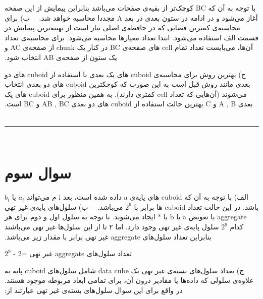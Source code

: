 ‫با توجه به آن که BC کوچک‌تر از بقیه‌ی صفحات می‌باشد بنابراین پیمایش از این صفحه آغاز می‌شود و در ادامه در ستون بعدی در بعد A مجددا محاسبه خواهد شد.
‫
‫‫\vspace{1cm}
‫
‫ب) برای محاسبه‌ی کمترین فضایی که در حافظه‌ی اصلی نیاز است از بهینه‌ترین پیمایش در قسمت الف استفاده می‌شود. ابتدا تعداد معیارها محاسبه می‌شود. برای محاسبه‌ی تعداد آن‌ها، می‌بایست تعداد تمام cell های صفحه‌ی BC در کنار یک chunk از صفحه‌ی AC و یک ستون از صفحه‌ی AB انتخاب شود.
‫


‫\vspace{1cm}
‫
‫ج) بهترین روش برای محاسبه‌ی cuboid های یک بعدی با استفاده از cuboid های دو بعدی مانند روش قبل است به این صورت که کوچکترین cuboid های دو بعدی انتخاب می‌شوند (آن‌هایی که تعداد cell کمتری دارند). به همین منظور برای cuboid های یک بعدی A , B و C بهترین حالت استفاده از cuboid های دو بعدی AB , BC و BC است.
‫
‫
‫\vspace{1cm}
‫
‫\hrule height .4 pt depth 0 pt width 16 cm \relax
‫
‫%
‫
‫\section{سوال سوم}
‫
‫   الف) با توجه به آن که cuboid های پایه‌ی a داده شده است، بعد i م می‌تواند $a_{i}$ یا $b_i$ باشد. در این حالت تعداد cuboid ها برابر با \colorbox{Emerald}{\(2^9\)} می‌باشد.
‫
‫\vspace{1cm}
‫
‫ب) سلول‌های پایه‌ی غیر تهی aggregate با تعویض a یا b با * ایجاد می‌شوند. با توجه به سلول اول و دوم برای هر کدام \(2^9\) سلول پایه‌ی غیر تهی وجود دارد. اما ۲ تا از این سلول‌ها غیر تهی می‌باشند بنابراین تعداد سلول‌های aggregate غیر تهی برابر با مقدار زیر می‌باشد.
‫\begin{center}
‫\colorbox{Emerald}{تعداد سلول‌های aggregate غیر تهی =2 - \(2^9\)}
‫\end{center}
‫
‫‫\vspace{1cm}
‫
‫ج) تعداد سلول‌های بسته‌ی غیر تهی یک data cube شامل سلول‌های cuboid پایه به علاوه‌ی سلولی که داده‌ها یا مقادیر درون آن، برای تمامی ابعاد مربوطه موجود هستند.‌ در واقع برای این سوال سلول‌های بسته‌ی غیر تهی عبارتند از:
‫

